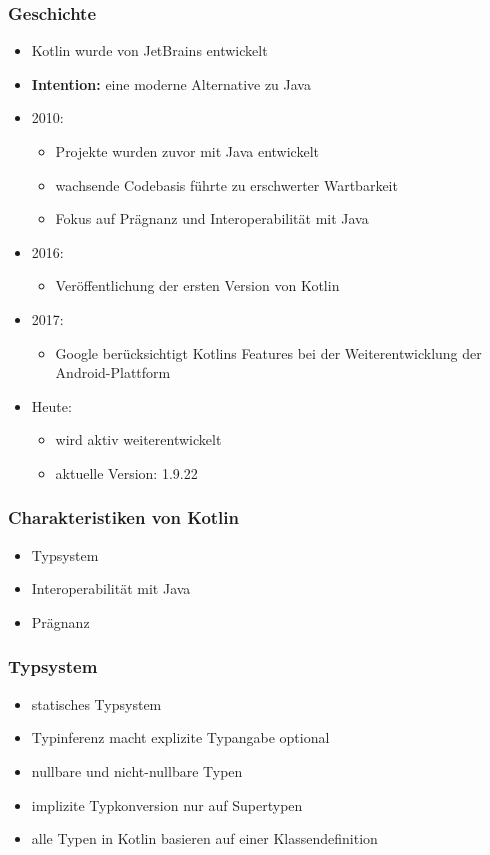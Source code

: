 \documentclass{beamer}
\begin{document}
\begin{frame}
\frametitle{Geschichte}
\begin{itemize}
    \item Kotlin wurde von JetBrains entwickelt
    \item \textbf{Intention:} eine moderne Alternative zu Java
    \item 2010:
    \begin{itemize}
        \item Projekte wurden zuvor mit Java entwickelt
        \item wachsende Codebasis führte zu erschwerter Wartbarkeit
        \item Fokus auf Prägnanz und Interoperabilität mit Java
    \end{itemize}
    \item 2016:
    \begin{itemize}
        \item Veröffentlichung der ersten Version von Kotlin
    \end{itemize}
    \item 2017:
    \begin{itemize}
        \item Google berücksichtigt Kotlins Features bei der Weiterentwicklung der Android-Plattform %
    \end{itemize}
    \item Heute:
    \begin{itemize}
        \item wird aktiv weiterentwickelt
        \item aktuelle Version: 1.9.22
    \end{itemize}
\end{itemize}
\end{frame}


\begin{frame}
\frametitle{Charakteristiken von Kotlin}
\begin{itemize}
\onehalfspacing
\item Typsystem
\item Interoperabilität mit Java
\item Prägnanz
\end{itemize}
\end{frame}

\begin{frame}
\frametitle{Typsystem}
\begin{itemize}
\onehalfspacing
    \item statisches Typsystem
    \item Typinferenz macht explizite Typangabe optional
    \item nullbare und nicht-nullbare Typen
    \item implizite Typkonversion nur auf Supertypen
    \item alle Typen in Kotlin basieren auf einer Klassendefinition
\end{itemize}
\end{frame}
\end{document}
